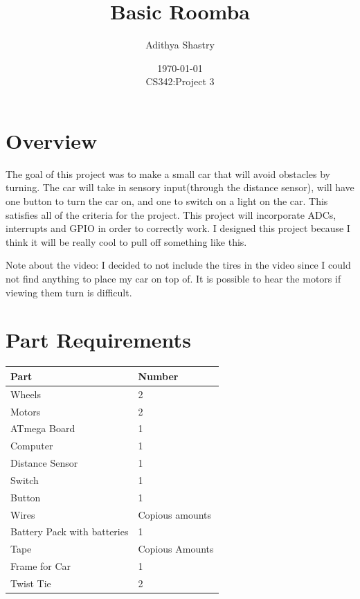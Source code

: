 \documentclass[12pt]{article}
\title{Basic Roomba}
\author{Adithya Shastry}
\date{\today \\ CS342:Project 3}
\begin{document}
\maketitle
\newpage
\section{Overview}
The goal of this project was to make a small car that will avoid obstacles by turning. The car will take in sensory input(through the distance sensor), will have one button to turn the car on, and one to switch on a light on the car. This satisfies all of the criteria for the project. This project will incorporate ADCs, interrupts and GPIO in order to correctly work. I designed this project because I think it will be really cool to pull off something like this.


Note about the video: I decided to not include the tires in the video since I could not find anything to place my car on top of. It is possible to hear the motors if viewing them turn is difficult.


\section{Part Requirements}

\begin{table}[h!]
\centering
\begin{tabular}{|l|l|}
\hline
Part & Number \\ \hline
Wheels & 2 \\ \hline
Motors & 2 \\ \hline
ATmega Board & 1 \\ \hline
Computer & 1 \\ \hline
Distance Sensor & 1 \\ \hline
Switch & 1 \\ \hline
Button & 1 \\ \hline
Wires & Copious amounts \\ \hline
Battery Pack with batteries & 1 \\ \hline
Tape & Copious Amounts \\ \hline
Frame for Car & 1 \\ \hline
Twist Tie & 2 \\ \hline
\end{tabular}
\end{table}
\end{document}
